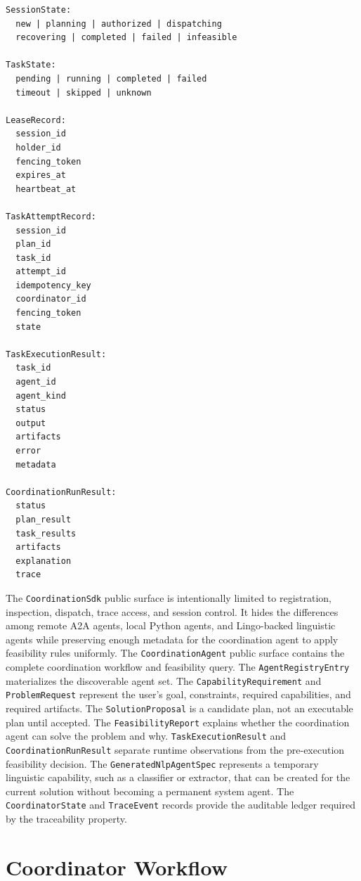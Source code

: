 \begin{Verbatim}[fontsize=\small,breaklines=true,breakanywhere=true]
SessionState:
  new | planning | authorized | dispatching
  recovering | completed | failed | infeasible

TaskState:
  pending | running | completed | failed
  timeout | skipped | unknown

LeaseRecord:
  session_id
  holder_id
  fencing_token
  expires_at
  heartbeat_at

TaskAttemptRecord:
  session_id
  plan_id
  task_id
  attempt_id
  idempotency_key
  coordinator_id
  fencing_token
  state

TaskExecutionResult:
  task_id
  agent_id
  agent_kind
  status
  output
  artifacts
  error
  metadata

CoordinationRunResult:
  status
  plan_result
  task_results
  artifacts
  explanation
  trace
\end{Verbatim}

The \texttt{CoordinationSdk} public surface is intentionally limited to registration, inspection, dispatch, trace access, and session control. It hides the differences among remote A2A agents, local Python agents, and Lingo-backed linguistic agents while preserving enough metadata for the coordination agent to apply feasibility rules uniformly. The \texttt{CoordinationAgent} public surface contains the complete coordination workflow and feasibility query. The \texttt{AgentRegistry\allowbreak Entry} materializes the discoverable agent set. The \texttt{Capability\allowbreak Requirement} and \texttt{Problem\allowbreak Request} represent the user's goal, constraints, required capabilities, and required artifacts. The \texttt{Solution\allowbreak Proposal} is a candidate plan, not an executable plan until accepted. The \texttt{Feasibility\allowbreak Report} explains whether the coordination agent can solve the problem and why. \texttt{TaskExecutionResult} and \texttt{CoordinationRunResult} separate runtime observations from the pre-execution feasibility decision. The \texttt{Generated\allowbreak Nlp\allowbreak Agent\allowbreak Spec} represents a temporary linguistic capability, such as a classifier or extractor, that can be created for the current solution without becoming a permanent system agent. The \texttt{Coordinator\allowbreak State} and \texttt{Trace\allowbreak Event} records provide the auditable ledger required by the traceability property.

\section{Coordinator Workflow}

